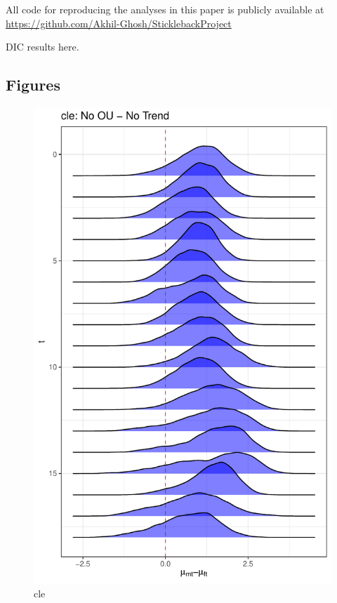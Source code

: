 \documentclass[
  12pt,
]{article}
\begin{document}
All code for reproducing the analyses in this paper is publicly
available at \url{https://github.com/Akhil-Ghosh/SticklebackProject}

DIC results here.

\hypertarget{figures}{%
\subsection{Figures}\label{figures}}

\begin{figure}

{\centering \includegraphics[width=0.9\linewidth]{../Figures/cle/mu_diff} 

}

\caption{cle}\label{fig:unnamed-chunk-6}
\end{figure}
\end{document}

